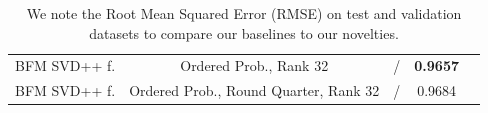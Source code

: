 \documentclass[10pt,conference,compsocconf]{IEEEtran}
\begin{document}
\begin{table}[h]
\begin{tabular}{|| c | c | c | c | c ||}
            BFM SVD++ f.         & Ordered Prob., Rank 32                & /                       & \textbf{ 0.9657 }      &                         \\
            BFM SVD++ f.         & Ordered Prob., Round Quarter, Rank 32 & /                       & 0.9684                 &                         \\
            \hline
        \end{tabular}
        \caption{We note the Root Mean Squared Error (RMSE) on test and validation datasets to compare our baselines to our novelties.}
        \label{tab:ablation}
    \end{table}

    \newpage

    \balance
    
    
\end{document}
